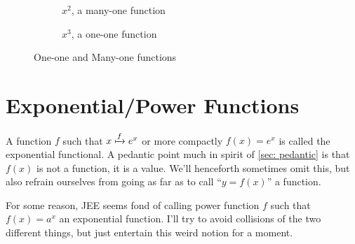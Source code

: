 

\begin{figure}[H]
    \begin{subfigure}{.5\textwidth}
        \centering
        \caption{ {\color{red}\(x^2\)}, a many-one function}
    \end{subfigure}%
    \begin{subfigure}{.5\textwidth}
        \centering
        \caption{{\color{blue}\(x^3\)}, a one-one function}
    \end{subfigure}
    \caption{{\color{blue}One-one} and {\color{red}Many-one} functions}
\end{figure}



\section{Exponential/Power Functions}


A function \(f\) such that \(x \xmapsto{f} e^x\) or more compactly \(f(x) = e^x\) is called
the exponential functional. A pedantic point much in spirit of \cref{sec: pedantic} 
is that \(f(x)\)
is not a function, it is a value. We'll henceforth sometimes omit this, but also refrain ourselves
from going as far as to call ``\(y = f(x)\)'' a function. 

For some reason, JEE seems fond of calling power function \(f\) such that \(f(x) = a^x\) an 
exponential function. I'll try to avoid collisions of the two different things, but just 
entertain this weird notion for a moment.
\parbreak

